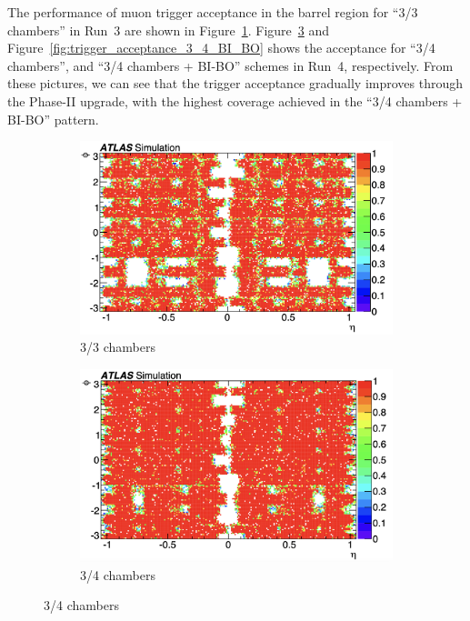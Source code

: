 The performance of muon trigger acceptance in the barrel region for ``3/3 chambers'' in Run~3  are shown in Figure~\ref{fig:trigger_acceptance_3_3}. Figure~\ref{fig:trigger_acceptance_3_4} and Figure~\ref{fig:trigger_acceptance_3_4_BI_BO} shows the acceptance for ``3/4 chambers'', and ``3/4 chambers + BI-BO'' schemes in Run~4, respectively. From these pictures, we can see that the trigger acceptance gradually improves through the Phase-II upgrade, with the highest coverage achieved in the ``3/4 chambers + BI-BO'' pattern.



\begin{figure}[htbp]
  \centering
  \begin{subfigure}{0.67\textwidth}
    \includegraphics[width=\textwidth]{figs/chapter4/trigger_acceptance_map_3_3.png}
    \caption{3/3 chambers}
    \label{fig:trigger_acceptance_3_3}
  \end{subfigure}


  \begin{subfigure}{0.67\textwidth}
    \includegraphics[width=\textwidth]{figs/chapter4/trigger_acceptance_map_3_4.png}
    \caption{3/4 chambers}
    \label{fig:trigger_acceptance_3_4}
  \end{subfigure}


\end{figure}
